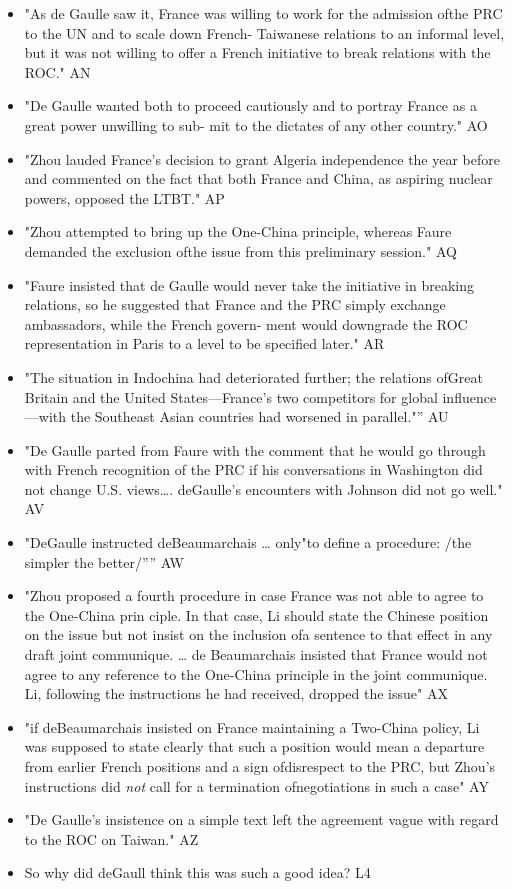 \documentclass[letterpaper]{article}
\begin{document}
\begin{itemize}
\item "As de Gaulle saw it, France was willing to work for the admission
ofthe PRC to the UN and to scale down French- Taiwanese relations to
an informal level, but it was not willing to offer a French initiative
to break relations with the ROC." AN
\item "De Gaulle wanted both to proceed cautiously and to portray France as
a great power unwilling to sub- mit to the dictates of any other
country." AO
\item "Zhou lauded France's decision to grant Algeria independence the year
before and commented on the fact that both France and China, as
aspiring nuclear powers, opposed the LTBT." AP
\item "Zhou attempted to bring up the One-China principle, whereas Faure
demanded the exclusion ofthe issue from this preliminary session." AQ
\item "Faure insisted that de Gaulle would never take the initiative in
breaking relations, so he suggested that France and the PRC simply
exchange ambassadors, while the French govern- ment would downgrade
the ROC representation in Paris to a level to be specified later." AR
\item "The situation in Indochina had deteriorated further; the relations
ofGreat Britain and the United States---France's two competitors for
global influence---with the Southeast Asian countries had worsened in
parallel."” AU
\item "De Gaulle parted from Faure with the comment that he would go through
with French recognition of the PRC if his conversations in Washington
did not change U.S. views\ldots{}. deGaulle's encounters with Johnson did
not go well." AV
\item "DeGaulle instructed deBeaumarchais \ldots{} only"to define a procedure:
/the simpler the better/”” AW
\item "Zhou proposed a fourth procedure in case France was not able to agree
to the One-China prin ciple. In that case, Li should state the Chinese
position on the issue but not insist on the inclusion ofa sentence to
that effect in any draft joint communique. \ldots{} de Beaumarchais
insisted that France would not agree to any reference to the One-China
principle in the joint communique. Li, following the instructions he
had received, dropped the issue" AX
\item "if deBeaumarchais insisted on France maintaining a Two-China policy,
Li was supposed to state clearly that such a position would mean a
departure from earlier French positions and a sign ofdisrespect to the
PRC, but Zhou's instructions did \emph{not} call for a termination
ofnegotiations in such a case" AY
\item "De Gaulle's insistence on a simple text left the agreement vague with
regard to the ROC on Taiwan." AZ
\item So why did deGaull think this was such a good idea? L4


\end{itemize}
\end{document}
